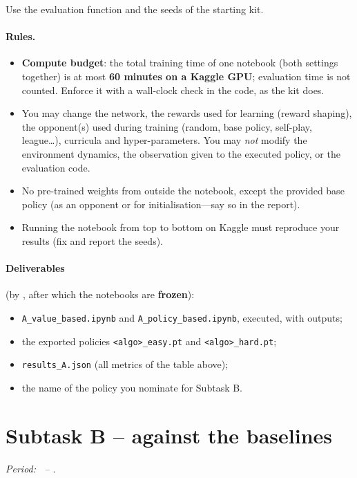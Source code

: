\documentclass[11pt,a4paper]{article}
\newcommand{\code}[1]{\texttt{#1}}
\begin{document}
\noindent Use the evaluation function and the seeds of the starting kit.

\paragraph{Rules.}
\begin{itemize}
  \item \textbf{Compute budget}: the total training time of one notebook (both settings
        together) is at most \textbf{60 minutes on a Kaggle GPU}; evaluation time is not
        counted.  Enforce it with a wall-clock check in the code, as the kit does.
  \item You may change the network, the rewards used for learning (reward shaping), the
        opponent(s) used during training (random, base policy, self-play, league\dots),
        curricula and hyper-parameters.  You may \emph{not} modify the environment
        dynamics, the observation given to the executed policy, or the evaluation code.
  \item No pre-trained weights from outside the notebook, except the provided base policy
        (as an opponent or for initialisation---say so in the report).
  \item Running the notebook from top to bottom on Kaggle must reproduce your results
        (fix and report the seeds).
\end{itemize}

\paragraph{Deliverables} (by \DateAEnd, after which the notebooks are \textbf{frozen}):
\begin{itemize}
  \item \code{A\_value\_based.ipynb} and \code{A\_policy\_based.ipynb}, executed, with outputs;
  \item the exported policies \code{<algo>\_easy.pt} and \code{<algo>\_hard.pt};
  \item \code{results\_A.json} (all metrics of the table above);
  \item the name of the policy you nominate for Subtask B.
\end{itemize}

\section{Subtask B -- against the baselines}
\emph{Period: \DateBStart\ -- \DateBEnd.}\par\smallskip
\end{document}
